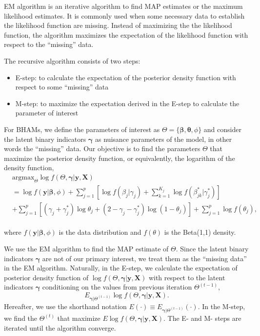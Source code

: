 \documentclass[AMA,STIX1COL,]{WileyNJD-v2}
\providecommand{\tightlist}{%
  \setlength{\itemsep}{0pt}\setlength{\parskip}{0pt}}
\begin{document}
EM algorithm is an iterative algorithm to find MAP estimates or the
maximum likelihood estimates. It is commonly used when some necessary
data to establish the likelihood function are missing. Instead of
maximizing the the likelihood function, the algorithm maximizes the
expectation of the likelihood function with respect to the ``missing''
data.

The recursive algorithm consists of two steps:

\begin{itemize}
\tightlist
\item
  E-step: to calculate the expectation of the posterior density function
  with respect to some ``missing'' data
\item
  M-step: to maximize the expectation derived in the E-step to calculate
  the parameter of interest
\end{itemize}

For BHAMs, we define the parameters of interest as
\(\Theta = \{\boldsymbol{\beta}, \boldsymbol{\theta}, \phi\}\) and
consider the latent binary indicators \(\boldsymbol{\gamma}\) as
nuisance parameters of the model, in other words the ``missing'' data.
Our objective is to find the parameters \(\Theta\) that maximize the
posterior density function, or equivalently, the logarithm of the
density function, \[
\begin{aligned}
& \text{argmax}_{\Theta}
\log f(\Theta, \boldsymbol{\gamma}| \textbf{y}, \textbf{X}) \\
&= \log f(\textbf{y}|\boldsymbol{\beta}, \phi) + \sum\limits_{j=1}^p\left[\log f(\beta_j|\gamma_j)+\sum\limits_{k=1}^{K_j} \log f(\beta^{*}_{jk}|\gamma^{*}_{j})\right]\\
& +\sum\limits_{j=1}^{p} \left[ (\gamma_j+\gamma_{j}^{*})\log \theta_j + (2-\gamma_j-\gamma_{j}^{*}) \log (1-\theta_j)\right] +  \sum\limits_{j=1}^{p}\log f(\theta_j),
\end{aligned}
\]\\
where \(f(\textbf{y}|\boldsymbol{\beta}, \phi)\) is the data
distribution and \(f(\theta)\) is the Beta(1,1) density.

We use the EM algorithm to find the MAP estimate of \(\Theta\). Since
the latent binary indicators \(\boldsymbol{\gamma}\) are not of our
primary interest, we treat them as the ``missing data'' in the EM
algorithm. Naturally, in the E-step, we calculate the expectation of
posterior density function of
\(\log f(\Theta, \boldsymbol{\gamma}| \textbf{y}, \textbf{X})\) with
respect to the latent indicators \(\boldsymbol{\gamma}\) conditioning on
the values from previous iteration \(\Theta^{(t-1)}\), \[
E_{\boldsymbol{\gamma}|\Theta^{(t-1)}}\log f(\Theta, \boldsymbol{\gamma}| \textbf{y}, \textbf{X}) .
\] Hereafter, we use the shorthand notation
\(E(\cdot)\equiv E_{\boldsymbol{\gamma}|\Theta^{(t-1)}}(\cdot)\). In the
M-step, we find the \(\Theta^{(t)}\) that maximize
\(E\log f(\Theta, \boldsymbol{\gamma}| \textbf{y}, \textbf{X})\). The E-
and M- steps are iterated until the algorithm converge.
\end{document}
